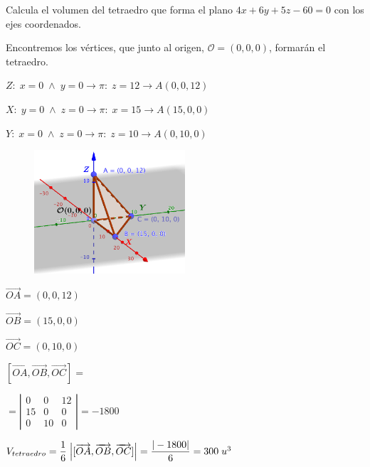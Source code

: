 \begin{ejre}
	Calcula el volumen del tetraedro que forma el plano $4x+6y+5z-60=0$ con los ejes coordenados.
\end{ejre}
\begin{proofw}\renewcommand{\qedsymbol}{$\diamond$}	
\noindent Encontremos los vértices, que junto al origen, $\mathcal O=(0,0,0)$, formarán el tetraedro.

\noindent $Z:\; x=0 \;\wedge\; y=0 \to \pi:\; z=12\to A(0,0,12)$

\noindent $X:\; y=0 \;\wedge\; z=0 \to \pi:\; x=15\to A(15,0,0)$

\noindent $Y:\;x=0 \;\wedge\; z=0 \to \pi:\; z=10\to A(0,10,0)$
\begin{multicols}{2}
\begin{figure}[H]
		\centering
		\includegraphics[width=0.5\textwidth]{imagenes/imagenes11/T11IM25.png}
	\end{figure}
 $\overrightarrow{OA}=(0,0,12)$

 $\overrightarrow{OB}=(15,0,0)$

$\overrightarrow{OC}=(0,10,0)$

$[\overrightarrow{OA},\overrightarrow{OB},\overrightarrow{OC}]= $

$=\left| \begin{matrix} 0&0&12\\15&0&0\\0&10&0 \end{matrix}\right|=-1800$
\end{multicols}
\noindent $V_{tetraedro}=\dfrac 1 6 \;\abs{[\overrightarrow{OA},\overrightarrow{OB},\overrightarrow{OC}]}=\dfrac {|-1800|}{6}=300\; u^3$
\end{proofw}

